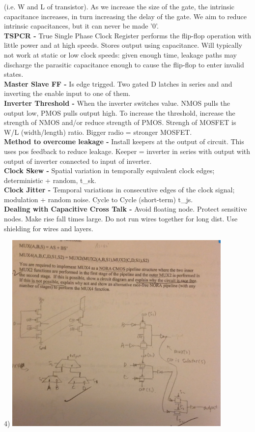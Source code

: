 \documentclass[9pt,fleqn]{article}
\begin{document}
\begin{multicols}{3}
    (i.e. W and L of transistor).  As we increase the size of the gate, the
    intrinsic capacitance increases, in turn increasing the delay of the gate.
    We aim to reduce intrinsic capacitances, but it can never be made '0'.\\
    \textbf{TSPCR -} True Single Phase Clock Register performs the flip-flop
    operation with little power and at high speeds. Stores output using
    capacitance. Will typically not work at static or low clock speeds: given
    enough time, leakage paths may discharge the parasitic capacitance enough
    to cause the flip-flop to enter invalid states.\\
    \textbf{Master Slave FF -} Is edge trigged. Two gated D latches in series
    and and inverting the enable input to one of them.\\
    \textbf{Inverter Threshold -} When the inverter switches value. NMOS pulls
    the output low, PMOS pulls output high. To increase the threshold,
    increase the strength of NMOS and/or reduce strength of PMOS. Strengh of
    MOSFET is W/L (width/length) ratio. Bigger radio = stronger MOSFET.\\
    \textbf{Method to overcome leakage -} Install keepers at the output of
    circuit. This uses pos feedback to reduce leakage. Keeper = inverter in
    series with output with output of inverter connected to input of inverter.\\
    \textbf{Clock Skew -} Spatial variation in temporally equivalent clock
    edges; deterministic + random, t\_sk. \\
    \textbf{Clock Jitter -} Temporal variations in consecutive edges of the
    clock signal; modulation + random noise. Cycle to Cycle (short-term) t\_js.\\
    \textbf{Dealing with Capacitive Cross Talk -} Avoid floating node. Protect
    sensitive nodes. Make rise fall times large. Do not run wires together for
    long dist. Use shielding for wires and layers.

    4) \includegraphics[width=\linewidth,height=10cm, width=7cm]{question4.png}


\end{multicols}
\end{document}
